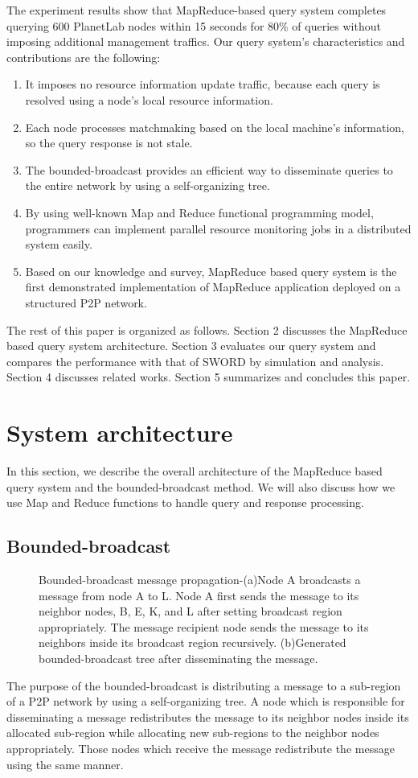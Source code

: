 \documentclass{acm_proc_article-sp}
\begin{document}
The experiment results show that MapReduce-based query system completes querying 600 PlanetLab nodes within 15 seconds for 80\% of queries without imposing additional management traffics.
Our query system's characteristics and contributions are the following:
\begin{enumerate}
\setlength{\itemsep}{0pt}
\setlength{\parskip}{0pt}
\item It imposes no resource information update traffic, because each query is resolved using a node's local resource information.
\item Each node processes matchmaking based on the local machine's information, so the query response is not stale.
\item The bounded-broadcast provides an efficient way to disseminate queries to the entire network by using a self-organizing tree.
\item By using well-known Map and Reduce functional programming model, programmers can implement parallel resource monitoring jobs in a distributed system easily.
\item Based on our knowledge and survey, MapReduce based query system is the first demonstrated implementation of MapReduce application deployed on a structured P2P network.
\end{enumerate}
The rest of this paper is organized as follows. 
Section 2 discusses the MapReduce based query system architecture. 
Section 3 evaluates our query system and compares the performance with that of SWORD by simulation and analysis. Section 4 discusses related works.
Section 5 summarizes and concludes this paper.

\section{System architecture}
In this section, we describe the overall architecture of the MapReduce based query system and the bounded-broadcast method. 
We will also discuss how we use Map and Reduce functions to handle query and response processing.
\subsection{Bounded-broadcast}
\begin{figure}[t]
\centering
{}
\caption{Bounded-broadcast message propagation-(a)Node A broadcasts a message from node A to L. Node A first sends the message to its neighbor nodes, B, E, K, and L after setting broadcast region appropriately.
The message recipient node sends the message to its neighbors inside its broadcast region recursively. (b)Generated bounded-broadcast tree after disseminating the message.
}
\end{figure}
The purpose of the bounded-broadcast\cite{deetoo} is distributing a message to a sub-region of a P2P network by using a self-organizing tree.
A node which is responsible for disseminating a message redistributes the message to its neighbor nodes inside its allocated sub-region while allocating new sub-regions to the neighbor nodes appropriately.
Those nodes which receive the message redistribute the message using the same manner.
\end{document}
